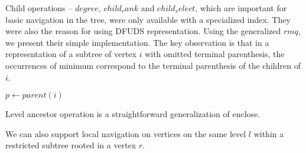 Child operations -- $degree$, $child_rank$ and $child_select$, which are important for basic navigation in the tree, were only available with a specialized index.
They were also the reason for using DFUDS representation.
Using the generalized $rmq$, we present their simple implementation.
The key observation is that in a representation of a subtree of vertex $i$ with omitted terminal parenthesis, the occurrences of minimum correspond to the terminal parenthesis of the children of $i$.

\begin{algorithmic}
	\State {}
\EndFunction
\end{algorithmic}

\begin{algorithmic}
	\State $p \gets parent(i)$
	\State {}
\EndFunction
\end{algorithmic}

\begin{algorithmic}
	\State {}
\EndFunction
\end{algorithmic}

Level ancestor operation is a straightforward generalization of enclose.

\begin{algorithmic}
	\State {}
\EndFunction
\end{algorithmic}

We can also support local navigation on vertices on the same level $l$ within a restricted subtree rooted in a vertex $r$.

\begin{algorithmic}
	\State {}
\EndFunction
\end{algorithmic}

\begin{algorithmic}
	\State {}
\EndFunction
\end{algorithmic}

\begin{algorithmic}
	\State {}
\EndFunction
\end{algorithmic}

